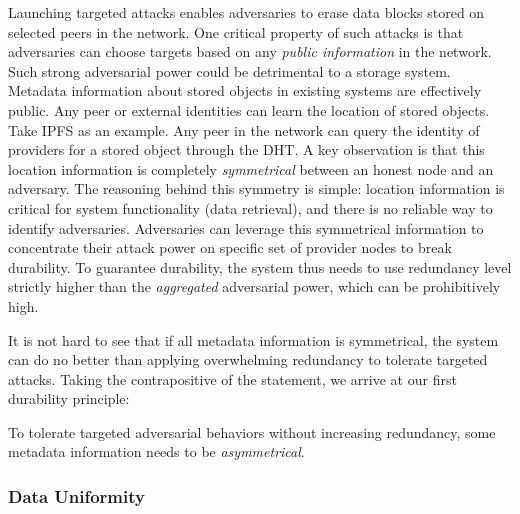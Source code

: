 Launching targeted attacks enables adversaries to erase data blocks stored on selected peers in the network.
One critical property of such attacks is that adversaries can choose targets based on any \emph{public information} in the network.
Such strong adversarial power could be detrimental to a storage system.
Metadata information about stored objects in existing systems are effectively public.
Any peer or external identities can learn the location of stored objects.
Take IPFS as an example.
Any peer in the network can query the identity of providers for a stored object through the DHT.
A key observation is that this location information is completely \emph{symmetrical} between an honest node and an adversary.
The reasoning behind this symmetry is simple: location information is critical for system functionality (data retrieval), and there is no reliable way to identify adversaries.
Adversaries can leverage this symmetrical information to concentrate their attack power on specific set of provider nodes to break durability.
To guarantee durability, the system thus needs to use redundancy level strictly higher than the \emph{aggregated} adversarial power, which can be prohibitively high.

It is not hard to see that if all metadata information is symmetrical, the system can do no better than applying overwhelming redundancy to tolerate targeted attacks.
Taking the contrapositive of the statement, we arrive at our first durability principle:

\begin{principle}
    To tolerate targeted adversarial behaviors without increasing redundancy, some metadata information needs to be \emph{asymmetrical}.
    \label{principle:asymmetry}
\end{principle}

\subsubsection{\textbf{Data Uniformity}}



